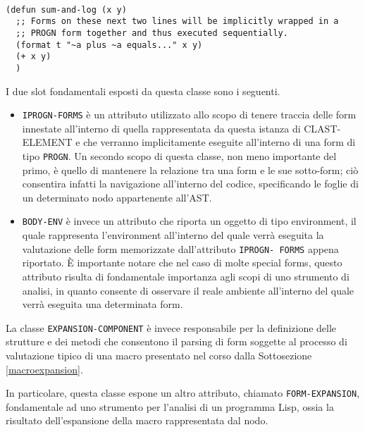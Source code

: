 \begin{lstlisting}[caption=Esempio di costrutto che fa utilizzo di del
costrutto PROGN in modo implicito]

(defun sum-and-log (x y)
  ;; Forms on these next two lines will be implicitly wrapped in a
  ;; PROGN form together and thus executed sequentially.
  (format t "~a plus ~a equals..." x y)
  (+ x y)
  )

\end{lstlisting}

I due slot fondamentali esposti da questa classe sono i seguenti.\\

\begin{itemize}

\item \texttt{IPROGN-FORMS} è un attributo utilizzato allo scopo di tenere
traccia delle form innestate all’interno di quella rappresentata da questa
istanza di CLAST-ELEMENT e che verranno implicitamente eseguite all’interno di
una form di tipo \texttt{PROGN}. Un secondo scopo di questa classe, non meno
importante del primo, è quello di mantenere la relazione tra una form e le sue
sotto-form; ciò consentira infatti la navigazione all'interno del codice,
specificando le foglie di un determinato nodo appartenente all'AST.

\item \texttt{BODY-ENV} è invece un attributo che riporta un oggetto di tipo
environment, il quale rappresenta l’environment all’interno del quale verrà
eseguita la valutazione delle form memorizzate dall’attributo \texttt{IPROGN-
FORMS} appena riportato. È importante notare che nel caso di molte special
forms, questo attributo risulta di fondamentale importanza agli scopi di uno
strumento di analisi, in quanto consente di osservare il reale ambiente
all'interno del quale verrà eseguita una determinata form.

\end{itemize}

La classe \texttt{EXPANSION-COMPONENT} è invece responsabile per la
definizione delle strutture e dei metodi che consentono il parsing di form
soggette al processo di valutazione tipico di una macro presentato nel corso
dalla Sottosezione \ref{macroexpansion}.

In particolare, questa classe espone un altro attributo, chiamato \texttt
{FORM-EXPANSION}, fondamentale ad uno strumento per l’analisi di un programma
Lisp, ossia la risultato dell’espansione della macro rappresentata dal nodo.\\

